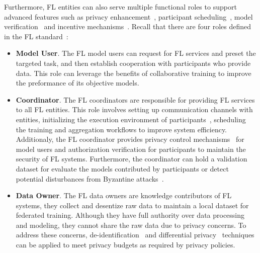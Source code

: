 Furthermore, FL entities can also serve multiple functional roles to support advanced features such as privacy enhancement~\cite{geyer2017differentially, bonawitz2017practical, niu2020billion}, participant scheduling~\cite{li2022federated, abdulrahman2020fedmccs}, model verification~\cite{tekgul2021waffle, shao2022fedtracker} and incentive mechanisms~\cite{yu2020fairness}.
Recall that there are four roles defined in the FL standard~\cite{IEEEstd3652}:

\begin{itemize}
    \item \textbf{Model User}. The FL model users can request for FL services and preset the targeted task, and then establish cooperation with participants who provide data. This role can leverage the benefits of collaborative training to improve the preformance of its objective models.
    
    \item \textbf{Coordinator}. The FL coordinators are responsible for providing FL services to all FL entities. This role involves setting up communication channels with entities, initializing the execution environment of participants~\cite{hanzlik2021mlcapsule}, scheduling the training and aggregation workflows to improve system efficiency.
    Additionaly, the FL coordinator provides privacy control mechanisms~\cite{bonawitz2017practical, el2022differential, hesamifard2018privacy} for model users and authorization verification for participants to maintain the security of FL systems. 
    Furthermore, the coordinator can hold a validation dataset for evaluate the models contributed by participants or detect potential disturbances from Byzantine attacks~\cite{sattler2020byzantine}.

    \item \textbf{Data Owner}. The FL data owners are knowledge contributors of FL systems, they collect and desentize raw data to maintain a local dataset for federated training. Although they have full authority over data processing and modeling, they cannot share the raw data due to privacy concerns. To address these concerns, de-identification~\cite{act1996health} and differential privacy~\cite{dwork2006differential} techniques can be applied to meet privacy budgets as required by privacy policies.
    

\end{itemize}
